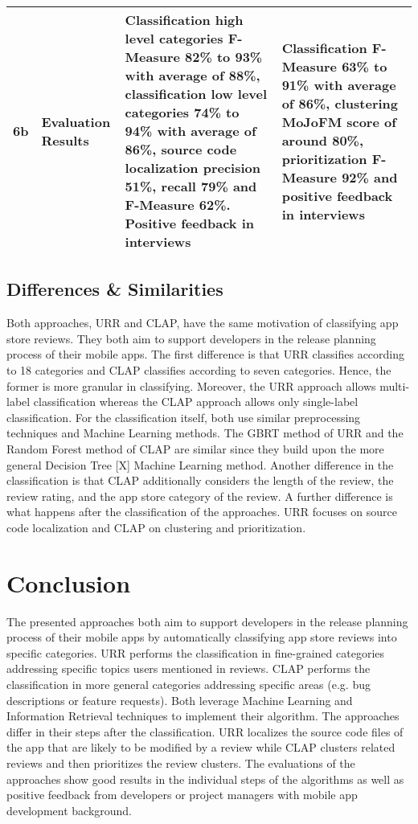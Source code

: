 \begin{table}
\begin{tabular}{l|p{2.5cm}|p{5cm}|p{5cm}}
        6b      & Evaluation Results                          & Classification high level categories F-Measure 82\% to 93\% with average of 88\%, classification low level categories 74\% to 94\% with average of 86\%, source code localization precision 51\%, recall 79\% and F-Measure 62\%. Positive feedback in interviews    & Classification F-Measure 63\% to 91\% with average of 86\%, clustering MoJoFM score of around 80\%, prioritization F-Measure 92\% and positive feedback in interviews \\ \hline
    \end{tabular}
    \label{tab:02_synthesis_matrix}
\end{table}


\subsection{Differences \& Similarities}

Both approaches, URR and CLAP, have the same motivation of classifying app store reviews. They both aim to support developers in the release planning process of their mobile apps. The first difference is that URR classifies according to 18 categories and CLAP classifies according to seven categories. Hence, the former is more granular in classifying. Moreover, the URR approach allows multi-label classification whereas the CLAP approach allows only single-label classification. For the classification itself, both use similar preprocessing techniques and Machine Learning methods. The GBRT method of URR and the Random Forest method of CLAP are similar since they build upon the more general Decision Tree [X] Machine Learning method. Another difference in the classification is that CLAP additionally considers the length of the review, the review rating, and the app store category of the review. A further difference is what happens after the classification of the approaches. URR focuses on source code localization and CLAP on clustering and prioritization.

\section{Conclusion}\label{sec:02_conclusion}

The presented approaches both aim to support developers in the release planning process of their mobile apps by automatically classifying app store reviews into specific categories. URR performs the classification in fine-grained categories addressing specific topics users mentioned in reviews. CLAP performs the classification in more general categories addressing specific areas (e.g. bug descriptions or feature requests). Both leverage Machine Learning and Information Retrieval techniques to implement their algorithm. The approaches differ in their steps after the classification. URR localizes the source code files of the app that are likely to be modified by a review while CLAP clusters related reviews and then prioritizes the review clusters. The evaluations of the approaches show good results in the individual steps of the algorithms as well as positive feedback from developers or project managers with mobile app development background.

